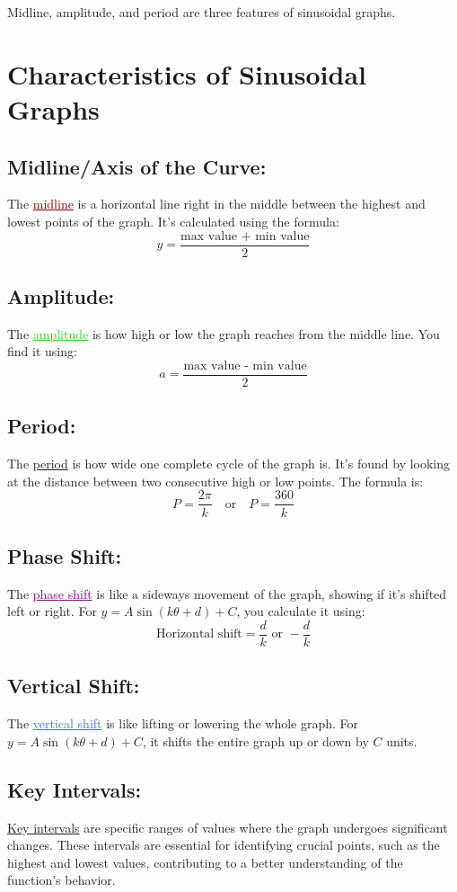 \documentclass{article}
\begin{document}
Midline, amplitude, and period are three features of sinusoidal graphs.
\newpage
\section{Characteristics of Sinusoidal Graphs}
\subsection{Midline/Axis of the Curve:}
The \textcolor{Maroon}{\underline{midline}} is a horizontal line right in the middle between the highest and lowest points of the graph. It's calculated using the formula:
\[y = \frac{\text{max value + min value}}{2}\]

\subsection{Amplitude:}
The \textcolor{LimeGreen}{\underline{amplitude}} is how high or low the graph reaches from the middle line. You find it using:
\[a = \frac{\text{max value - min value}}{2}\]

\subsection{Period:}
The \textcolor{Periwinkle}{\underline{period}} is how wide one complete cycle of the graph is. It's found by looking at the distance between two consecutive high or low points. The formula is:
\[P = \frac{2\pi}{k}\quad \text{or} \quad P = \frac{360}{k} \]

\subsection{Phase Shift:}
The \textcolor{Purple}{\underline{phase shift}} is like a sideways movement of the graph, showing if it's shifted left or right. For \(y = A \sin(k \theta + d) + C\), you calculate it using:
\[\text{Horizontal shift} = \frac{d}{k} \text{ or }  -\frac{d}{k}\]

\subsection{Vertical Shift:}
The \textcolor{RoyalBlue}{\underline{vertical shift}} is like lifting or lowering the whole graph. For \(y = A \sin(k \theta + d) + C\), it shifts the entire graph up or down by \(C\) units.

\subsection{Key Intervals:}
\textcolor{OliveGreen}{\underline{Key intervals}} are specific ranges of values where the graph undergoes significant changes. These intervals are essential for identifying crucial points, such as the highest and lowest values, contributing to a better understanding of the function's behavior.
\end{document}
